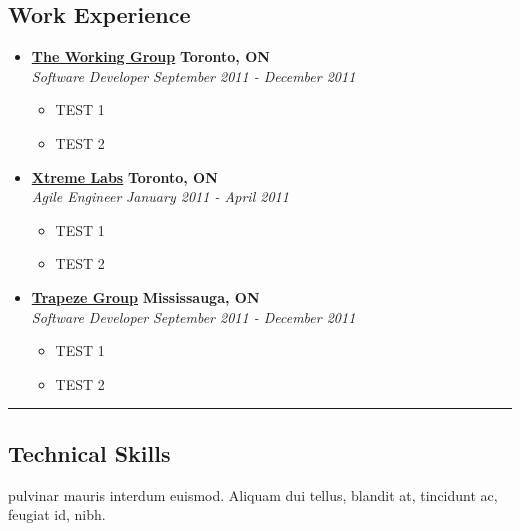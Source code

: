 \documentclass[10pt,letterpaper]{article}
\begin{document}
\subsection*{Work Experience}
  \begin{itemize}
    \parskip=-0.1em

    \item[]
    {\href{http://www.twg.ca}{\textbf{The Working Group}} \hfill
      \textbf{Toronto, ON}}
    \\
    {\emph{Software Developer} \hfill \emph{September 2011 - December 2011}}

    \begin{itemize}[label=\textbullet]
      \item TEST 1
      \item TEST 2
    \end{itemize}

    \item[]

    {\href{http://www.xtremelabs.com/}{\textbf{Xtreme Labs}} \hfill
      \textbf{Toronto, ON}}
    \\
    {\emph{Agile Engineer} \hfill \emph{January 2011 - April 2011}}

    \begin{itemize}[label=\textbullet]
      \item TEST 1
      \item TEST 2
    \end{itemize}

    \item[]
    {\href{http://www.trapezegroup.com/}{\textbf{Trapeze Group}} \hfill
      \textbf{Mississauga, ON}}
    \\
    {\emph{Software Developer} \hfill \emph{September 2011 - December 2011}}

    \begin{itemize}[label=\textbullet]
      \item TEST 1
      \item TEST 2
    \end{itemize}
  \end{itemize}


\hrule
\vspace{-0.4em}
\subsection*{Technical Skills}

pulvinar mauris interdum euismod. Aliquam dui tellus, blandit at, tincidunt ac,
feugiat id, nibh.
\\
\end{document}
